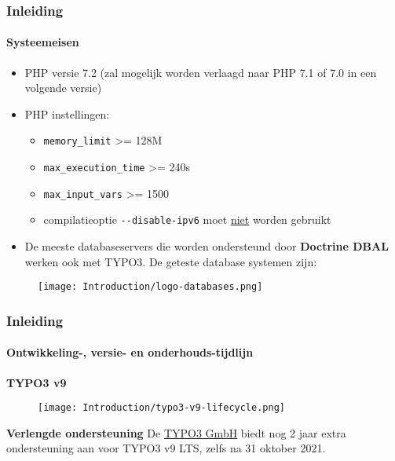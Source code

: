 \begin{frame}[fragile]
	\frametitle{Inleiding}
	\framesubtitle{Systeemeisen}

	\begin{itemize}
		\item PHP versie 7.2\newline
			\smaller
				(zal mogelijk worden verlaagd naar PHP 7.1 of 7.0 in een volgende versie)
			\normalsize

		\item PHP instellingen:

			\begin{itemize}
				\item \texttt{memory\_limit} >= 128M
				\item \texttt{max\_execution\_time} >= 240s
				\item \texttt{max\_input\_vars} >= 1500
				\item compilatieoptie \texttt{-}\texttt{-disable-ipv6} moet \underline{niet} worden gebruikt
			\end{itemize}

		\item De meeste databaseservers die worden ondersteund door \textbf{Doctrine DBAL} werken ook met TYPO3.
			De geteste database systemen zijn:
	\end{itemize}

	\begin{figure}
		\texttt{[image: Introduction/logo-databases.png]}
	\end{figure}

\end{frame}

\begin{frame}[fragile]
	\frametitle{Inleiding}
	\framesubtitle{Ontwikkeling-, versie- en onderhouds-tijdlijn}

	\textbf{TYPO3 v9}

	\begin{figure}
		\texttt{[image: Introduction/typo3-v9-lifecycle.png]}
	\end{figure}

	\textbf{Verlengde ondersteuning}\newline
	\smaller
		De \href{https://typo3.com}{TYPO3 GmbH} biedt nog 2 jaar extra ondersteuning aan
		voor TYPO3 v9 LTS, zelfs na 31 oktober 2021.
	\normalsize


\end{frame}

